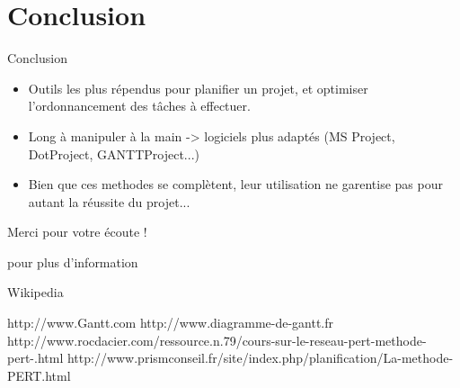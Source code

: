 \documentclass{beamer}
\begin{document}
\section{Conclusion}

\begin{frame}{Conclusion}
    \begin{itemize}
        \item Outils les plus répendus pour planifier un projet, et optimiser l'ordonnancement des tâches à effectuer.
        \item Long à manipuler à la main -> logiciels plus adaptés (MS Project, DotProject, GANTTProject...)
        \item Bien que ces methodes se complètent, leur utilisation ne garentise pas pour autant la réussite du projet...  
    \end{itemize}
\end{frame}

\begin{frame}
\centering
    Merci pour votre écoute !
\end{frame}
\begin{frame}{pour plus d'information}
    \begin{thebibliography}{10}
    
    \beamertemplatebookbibitems   

    Wikipedia
    
    \beamertemplatearticlebibitems
    \bibitem{}
   http://www.Gantt.com
    \bibitem{}
   http://www.diagramme-de-gantt.fr
    \bibitem{} http://www.rocdacier.com/ressource.n.79/cours-sur-le-reseau-pert-methode-pert-.html
    \bibitem{} http://www.prismconseil.fr/site/index.php/planification/La-methode-PERT.html
\end{thebibliography}
\end{frame}

  
\end{document}
